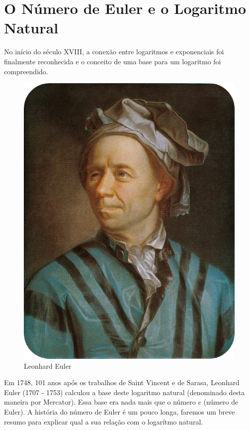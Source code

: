\section{O Número de Euler e o Logaritmo Natural}

No início do século XVIII, a conexão entre logaritmos e exponenciais foi finalmente reconhecida e o conceito de uma base para um logaritmo foi compreendido.

\begin{figure}
    \setlength{\intextsep}{0pt}
    \vspace{-1.5em} 
    \centering
    \includegraphics[width=\linewidth]{img/Euler.png}
    \caption*{Leonhard Euler}
\end{figure}

Em 1748, 101 anos após os trabalhos de Saint Vincent e de Sarasa, Leonhard Euler (1707 - 1753) calculou a base deste logaritmo natural (denominado desta maneira por Mercator). Essa base era nada mais que o número $e$ (número de Euler). A história do número de Euler é um pouco longa, faremos um breve resumo para explicar qual a sua relação com o logarítmo natural.

